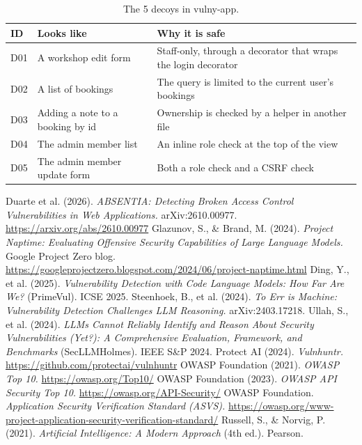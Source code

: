 \documentclass[11pt,a4paper]{article}
\begin{document}
\begin{table}[H]
\centering
\small
\caption{The 5 decoys in vulny-app.}
\begin{tabularx}{\linewidth}{@{}l >{\raggedright\arraybackslash}p{5.2cm} Y@{}}
\toprule
\textbf{ID} & \textbf{Looks like} & \textbf{Why it is safe} \\
\midrule
D01 & A workshop edit form & Staff-only, through a decorator that wraps the login decorator \\
D02 & A list of bookings & The query is limited to the current user's bookings \\
D03 & Adding a note to a booking by id & Ownership is checked by a helper in another file \\
D04 & The admin member list & An inline role check at the top of the view \\
D05 & The admin member update form & Both a role check and a CSRF check \\
\bottomrule
\end{tabularx}
\end{table}

\begin{thebibliography}{99}
\small
{} Duarte et al. (2026). \emph{ABSENTIA: Detecting Broken Access Control Vulnerabilities in Web
  Applications.} arXiv:2610.00977. \url{https://arxiv.org/abs/2610.00977}
 Glazunov, S., \& Brand, M. (2024). \emph{Project Naptime: Evaluating Offensive Security Capabilities
  of Large Language Models.} Google Project Zero blog.
  \url{https://googleprojectzero.blogspot.com/2024/06/project-naptime.html}
 Ding, Y., et al. (2025). \emph{Vulnerability Detection with Code Language Models: How Far Are We?}
  (PrimeVul). ICSE 2025.
 Steenhoek, B., et al. (2024). \emph{To Err is Machine: Vulnerability Detection Challenges LLM
  Reasoning.} arXiv:2403.17218.
 Ullah, S., et al. (2024). \emph{LLMs Cannot Reliably Identify and Reason About Security
  Vulnerabilities (Yet?): A Comprehensive Evaluation, Framework, and Benchmarks} (SecLLMHolmes). IEEE S\&P 2024.
 Protect AI (2024). \emph{Vulnhuntr.} \url{https://github.com/protectai/vulnhuntr}
 OWASP Foundation (2021). \emph{OWASP Top 10.} \url{https://owasp.org/Top10/}
 OWASP Foundation (2023). \emph{OWASP API Security Top 10.} \url{https://owasp.org/API-Security/}
 OWASP Foundation. \emph{Application Security Verification Standard (ASVS).}
  \url{https://owasp.org/www-project-application-security-verification-standard/}
 Russell, S., \& Norvig, P. (2021). \emph{Artificial Intelligence: A Modern Approach} (4th ed.).
  Pearson.
\end{thebibliography}
\end{document}
